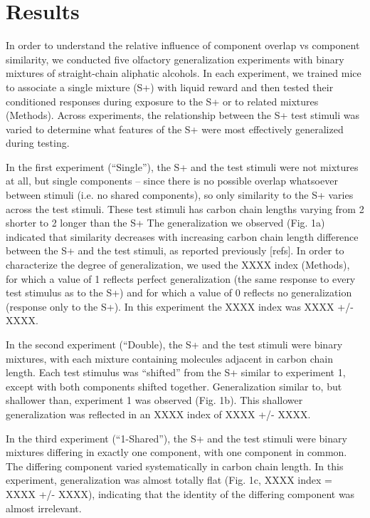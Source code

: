 \section{Results}

In order to understand the relative influence of component overlap vs component similarity, we conducted five olfactory generalization experiments with binary mixtures of straight-chain aliphatic alcohols.  In each experiment, we trained mice to associate a single mixture (S+) with liquid reward and then tested their conditioned responses during exposure to the S+ or to related mixtures (Methods).  Across experiments, the relationship between the S+ test stimuli was varied to determine what features of the S+ were most effectively generalized during testing.  

In the first experiment (“Single”), the S+ and the test stimuli were not mixtures at all, but single components -- since there is no possible overlap whatsoever between stimuli (i.e. no shared components), so only similarity to the S+ varies across the test stimuli.  These test stimuli has carbon chain lengths varying from 2 shorter to 2 longer than the S+  The generalization we observed (Fig. 1a) indicated that similarity decreases with increasing carbon chain length difference between the S+ and the test stimuli, as reported previously [refs].  In order to characterize the degree of generalization, we used the XXXX index (Methods), for which a value of 1 reflects perfect generalization (the same response to every test stimulus as to the S+) and for which a value of 0 reflects no generalization (response only to the S+).  In this experiment the XXXX index was XXXX +/- XXXX.  

In the second experiment (“Double), the S+ and the test stimuli were binary mixtures, with each mixture containing molecules adjacent in carbon chain length.  Each test stimulus was “shifted” from the S+ similar to experiment 1, except with both components shifted together.  Generalization similar to, but shallower than, experiment 1 was observed (Fig. 1b).  This shallower generalization was reflected in an XXXX index of XXXX +/- XXXX.  

In the third experiment (“1-Shared”), the S+ and the test stimuli were binary mixtures differing in exactly one component, with one component in common.  The differing component varied systematically in carbon chain length.  In this experiment, generalization was almost totally flat (Fig. 1c, XXXX index = XXXX +/- XXXX), indicating that the identity of the differing component was almost irrelevant.  


